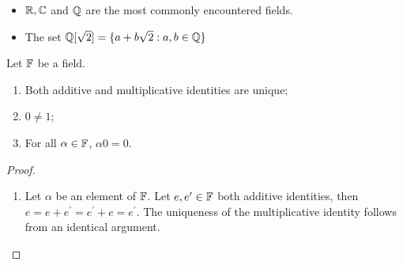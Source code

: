 \begin{example}
	
\begin{itemize}
	\item $\mathbb{R}, \mathbb{C}$ and $\mathbb{Q}$ are the most commonly encountered fields.
	\item The set $ \mathbb{Q}[\sqrt 2] = \{a + b \sqrt 2 : a, b \in \mathbb{Q} \}$
\end{itemize}	
\end{example}

\begin{proposition}
	Let $\mathbb{F}$ be a field.
\begin{enumerate}
	\item Both additive and multiplicative identities are unique; 
	\item $0 \neq 1$;
	\item For all $\alpha \in \mathbb{F}$, $\alpha 0 = 0$.
\end{enumerate}
\end{proposition}
\begin{proof}
	\begin{enumerate}
	\item	
		Let $\alpha$ be an element of $\mathbb{F}$. Let $e, e^\prime \in \mathbb{F}$ both additive identities, then $e = e + e^\prime = e^\prime + e = e^\prime$. The uniqueness of the multiplicative identity follows from an identical argument.	
	\end{enumerate}
\end{proof}

